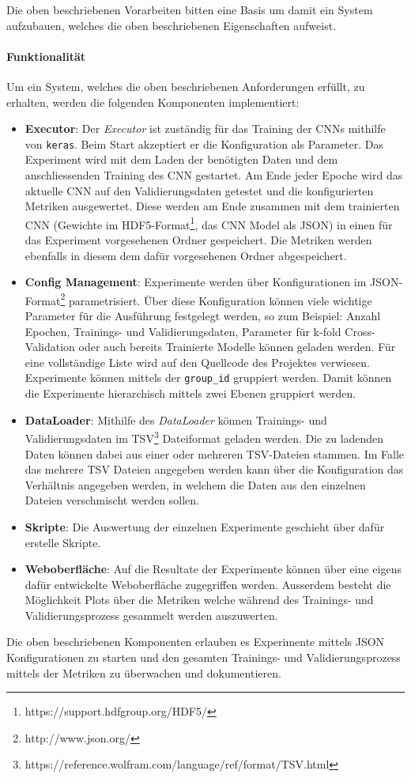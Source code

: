 Die oben beschriebenen Vorarbeiten bitten eine Basis um damit ein System aufzubauen, welches die oben beschriebenen Eigenschaften aufweist.
\paragraph{Funktionalität}
\label{technical_setup:functionality}
Um ein System, welches die oben beschriebenen Anforderungen erfüllt, zu erhalten, werden die folgenden Komponenten implementiert:

\begin{itemize}
	\item \textbf{Executor}: Der \emph{Executor} ist zuständig für das Training der CNNs mithilfe von \texttt{keras}. Beim Start akzeptiert er die Konfiguration als Parameter. Das Experiment wird mit dem Laden der benötigten Daten und dem anschliessenden Training des CNN gestartet. Am Ende jeder Epoche wird das aktuelle CNN auf den Validierungsdaten getestet und die konfigurierten Metriken ausgewertet. Diese werden am Ende zusammen mit dem trainierten CNN (Gewichte im HDF5-Format\footnote{https://support.hdfgroup.org/HDF5/}, das CNN Model als JSON) in einen für das Experiment vorgesehenen Ordner gespeichert. Die Metriken werden ebenfalls in diesem dem dafür vorgesehenen Ordner abgespeichert.
	\item \textbf{Config Management}: Experimente werden über Konfigurationen im JSON-Format\footnote{http://www.json.org/} parametrisiert. Über diese Konfiguration können viele wichtige Parameter für die Ausführung festgelegt werden, so zum Beispiel: Anzahl Epochen, Trainings- und Validierungsdaten, Parameter für k-fold Cross-Validation oder auch bereits Trainierte Modelle können geladen werden. Für eine vollständige Liste wird auf den Quellcode des Projektes verwiesen. Experimente können mittels der \texttt{group{\_}id} gruppiert werden. Damit können die Experimente hierarchisch mittels zwei Ebenen gruppiert werden.
	\item \textbf{DataLoader}: Mithilfe des \emph{DataLoader} können Trainings- und Validierungsdaten im TSV\footnote{https://reference.wolfram.com/language/ref/format/TSV.html} Dateiformat geladen werden. Die zu ladenden Daten können dabei aus einer oder mehreren TSV-Dateien stammen. Im Falle das mehrere TSV Dateien angegeben werden kann über die Konfiguration das Verhältnis angegeben werden, in welchem die Daten aus den einzelnen Dateien verschmischt werden sollen.
	\item \textbf{Skripte}: Die Auswertung der einzelnen Experimente geschieht über dafür erstelle Skripte.
	\item \textbf{Weboberfläche}: Auf die Resultate der Experimente können über eine eigens dafür entwickelte Weboberfläche zugegriffen werden. Ausserdem besteht die Möglichkeit Plots über die Metriken welche während des Trainings- und Validierungsprozess gesammelt werden auszuwerten.

\end{itemize}
Die oben beschriebenen Komponenten erlauben es Experimente mittels JSON Konfigurationen zu starten und den gesamten Trainings- und Validierungsprozess mittels der Metriken zu überwachen und dokumentieren.

